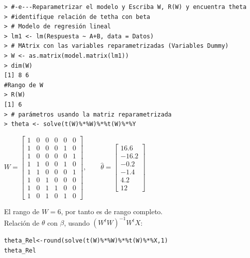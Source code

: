 \documentclass[10pt,a4paper]{report}
\begin{document}
\begin{enumerate}
\begin{verbatim}
> #-e---Reparametrizar el modelo y Escriba W, R(W) y encuentra theta
> #identifique relación de tetha con beta
> # Modelo de regresión lineal
> lm1 <- lm(Respuesta ~ A+B, data = Datos)
> # MAtrix con las variables reparametrizadas (Variables Dummy)
> W <- as.matrix(model.matrix(lm1))
> dim(W)
[1] 8 6
#Rango de W
> R(W)
[1] 6
> # parámetros usando la matriz reparametrizada
> theta <- solve(t(W)%*%W)%*%t(W)%*%Y
\end{verbatim}  

$W=\begin{bmatrix}
1 & 0 & 0 & 0 & 0 & 0 \\
1 & 0 & 0 & 0 & 1 & 0 \\
1 & 0 & 0 & 0 & 0 & 1 \\
1 & 1 & 0 & 0 & 1 & 0 \\
1 & 1 & 0 & 0 & 0 & 1 \\
1 & 0 & 1 & 0 & 0 & 0 \\
1 & 0 & 1 & 1 & 0 & 0 \\
1 & 0 & 1 & 0 & 1 & 0
\end{bmatrix},\qquad
\hat{\theta}=\begin{bmatrix}
16.6 \\ -16.2 \\ -0.2 \\ -1.4 \\ 4.2 \\ 12 
\end{bmatrix}
$


El rango de $W=6$, por tanto es de rango completo.\\


Relación de $\theta$ con $\beta$, usando $(W^tW)^{-1}W^tX$:
\begin{verbatim}
theta_Rel<-round(solve(t(W)%*%W)%*%t(W)%*%X,1)
theta_Rel
\end{verbatim}


\end{enumerate}
\end{document}
